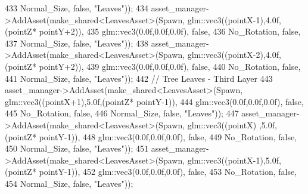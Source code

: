 \begin{DoxyCode}
433                                                              Normal\_Size, \textcolor{keyword}{false}, \textcolor{stringliteral}{"Leaves"}));
434             asset\_manager->AddAsset(make\_shared<LeavesAsset>(Spawn, glm::vec3((pointX-1),4.0f,(pointZ*
      pointY+2)),
435                                                              glm::vec3(0.0f,0.0f,0.0f), \textcolor{keyword}{false},
436                                                              No\_Rotation, \textcolor{keyword}{false},
437                                                              Normal\_Size, \textcolor{keyword}{false}, \textcolor{stringliteral}{"Leaves"}));
438             asset\_manager->AddAsset(make\_shared<LeavesAsset>(Spawn, glm::vec3((pointX-2),4.0f,(pointZ*
      pointY+2)),
439                                                              glm::vec3(0.0f,0.0f,0.0f), \textcolor{keyword}{false},
440                                                              No\_Rotation, \textcolor{keyword}{false},
441                                                              Normal\_Size, \textcolor{keyword}{false}, \textcolor{stringliteral}{"Leaves"}));
442             \textcolor{comment}{// Tree Leaves - Third Layer}
443             asset\_manager->AddAsset(make\_shared<LeavesAsset>(Spawn, glm::vec3((pointX+1),5.0f,(pointZ*
      pointY-1)),
444                                                              glm::vec3(0.0f,0.0f,0.0f), \textcolor{keyword}{false},
445                                                              No\_Rotation, \textcolor{keyword}{false},
446                                                              Normal\_Size, \textcolor{keyword}{false}, \textcolor{stringliteral}{"Leaves"}));
447             asset\_manager->AddAsset(make\_shared<LeavesAsset>(Spawn, glm::vec3((pointX)  ,5.0f,(pointZ*
      pointY-1)),
448                                                              glm::vec3(0.0f,0.0f,0.0f), \textcolor{keyword}{false},
449                                                              No\_Rotation, \textcolor{keyword}{false},
450                                                              Normal\_Size, \textcolor{keyword}{false}, \textcolor{stringliteral}{"Leaves"}));
451             asset\_manager->AddAsset(make\_shared<LeavesAsset>(Spawn, glm::vec3((pointX-1),5.0f,(pointZ*
      pointY-1)),
452                                                              glm::vec3(0.0f,0.0f,0.0f), \textcolor{keyword}{false},
453                                                              No\_Rotation, \textcolor{keyword}{false},
454                                                              Normal\_Size, \textcolor{keyword}{false}, \textcolor{stringliteral}{"Leaves"})); 

\end{DoxyCode}
